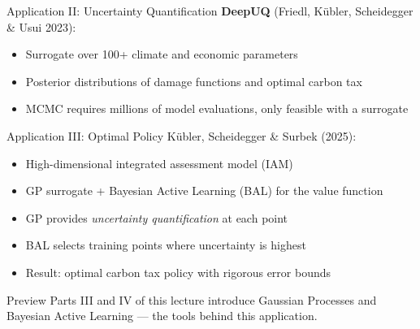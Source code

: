 \documentclass[aspectratio=169,11pt]{beamer}
\newcommand{\emphc}[1]{\textcolor{harvardcrimson}{#1}}
\begin{document}
\begin{frame}{Application II: Uncertainty Quantification}
\textbf{DeepUQ} (Friedl, K\"ubler, Scheidegger \& Usui 2023):

\vspace{0.3cm}
\begin{center}
\end{center}

\vspace{0.2cm}
\begin{itemize}\small\itemsep1pt
  \item Surrogate over \emphc{100+ climate and economic parameters}
  \item Posterior distributions of \emphc{damage functions} and \emphc{optimal carbon tax}
  \item MCMC requires millions of model evaluations, only feasible with a surrogate
\end{itemize}
\end{frame}

\begin{frame}{Application III: Optimal Policy}
K\"ubler, Scheidegger \& Surbek (2025):

\vspace{0.3cm}
\begin{itemize}
  \item High-dimensional integrated assessment model (IAM)
  \item \emphc{GP surrogate + Bayesian Active Learning (BAL)} for the value function
  \item GP provides \emph{uncertainty quantification} at each point
  \item BAL selects training points where uncertainty is highest
  \item Result: optimal carbon tax policy with \emphc{rigorous error bounds}
\end{itemize}

\vspace{0.3cm}
\begin{alertblock}{Preview}
Parts III and IV of this lecture introduce \emphc{Gaussian Processes} and \emphc{Bayesian Active Learning} --- the tools behind this application.
\end{alertblock}
\end{frame}
\end{document}
